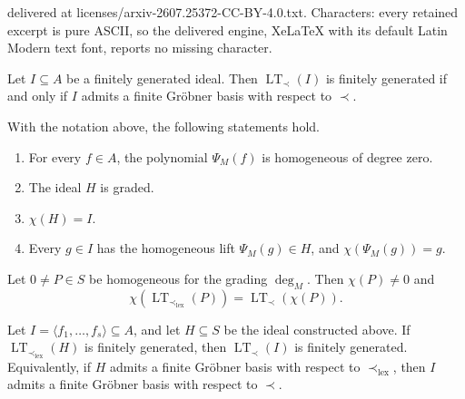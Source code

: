 \documentclass[10pt,a4paper]{amsart}
\newcommand{\LT}{\operatorname{LT}}
\begin{document}
delivered at licenses/arxiv-2607.25372-CC-BY-4.0.txt. Characters: every retained excerpt is pure ASCII, so the delivered engine, XeLaTeX with its default Latin Modern text font, reports no missing character.
	\begin{proposition}
		\label{prop:finite-grobner-basis}
		Let $I\subseteq A$ be a finitely generated ideal. Then
		$\LT_\prec(I)$ is finitely generated if and only if $I$ admits a
		finite Gr\"obner basis with respect to $\prec$.
	\end{proposition}

	\begin{proposition}
		\label{prop:homogeneous-lifts}
		With the notation above, the following statements hold.
		\begin{enumerate}
			\item For every $f\in A$, the polynomial $\Psi_M(f)$ is homogeneous
			of degree zero.
			\item The ideal $H$ is graded.
			\item $\chi(H)=I$.
			\item Every $g\in I$ has the homogeneous lift $\Psi_M(g)\in H$, and
			$\chi(\Psi_M(g))=g$.
		\end{enumerate}
	\end{proposition}

	\begin{lemma}
		\label{thm:exact-leading-term-correspondence}
		Let $0\neq P\in S$ be homogeneous for the grading $\deg_M$. Then
		$\chi(P)\neq0$ and
		\begin{equation}
			\label{eq:exact-leading-term-correspondence}
			\chi\!\left(\LT_{\prec_{\mathrm{lex}}}(P)\right)
			=
			\LT_\prec\!\left(\chi(P)\right).
		\end{equation}
	\end{lemma}

	\begin{theorem}
		\label{thm:fixed-ideal-reduction}
		Let $I=\langle f_1,\ldots,f_s\rangle\subseteq A$, and let $H\subseteq
		S$ be the ideal constructed above. If
		$\LT_{\prec_{\mathrm{lex}}}(H)$ is finitely generated, then
		$\LT_\prec(I)$ is finitely generated. Equivalently, if $H$ admits a
		finite Gr\"obner basis with respect to $\prec_{\mathrm{lex}}$, then
		$I$ admits a finite Gr\"obner basis with respect to $\prec$.
	\end{theorem}
\end{document}
